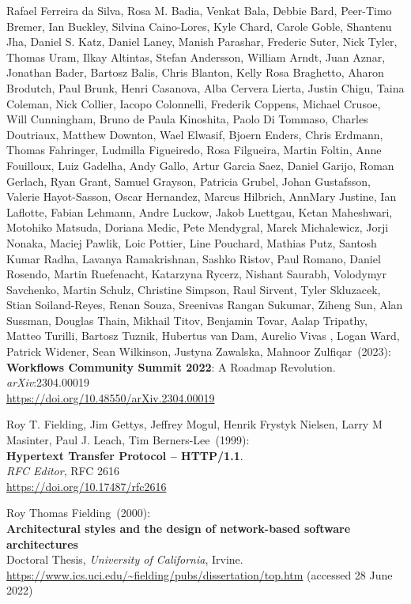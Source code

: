 \begin{thebibliography}{9}
Rafael Ferreira da Silva, Rosa M. Badia, Venkat Bala, Debbie Bard, Peer-Timo Bremer, Ian Buckley, Silvina Caino-Lores, Kyle Chard, Carole Goble, Shantenu Jha, Daniel S. Katz, Daniel Laney, Manish Parashar, Frederic Suter, Nick Tyler, Thomas Uram, Ilkay Altintas, Stefan Andersson, William Arndt, Juan Aznar, Jonathan Bader, Bartosz Balis, Chris Blanton, Kelly Rosa Braghetto, Aharon Brodutch, Paul Brunk, Henri Casanova, Alba Cervera Lierta, Justin Chigu, Taina Coleman, Nick Collier, Iacopo Colonnelli, Frederik Coppens, Michael Crusoe, Will Cunningham, Bruno de Paula Kinoshita, Paolo Di Tommaso, Charles Doutriaux, Matthew Downton, Wael Elwasif, Bjoern Enders, Chris Erdmann, Thomas Fahringer, Ludmilla Figueiredo, Rosa Filgueira, Martin Foltin, Anne Fouilloux, Luiz Gadelha, Andy Gallo, Artur Garcia Saez, Daniel Garijo, Roman Gerlach, Ryan Grant, Samuel Grayson, Patricia Grubel, Johan Gustafsson, Valerie Hayot-Sasson, Oscar Hernandez, Marcus Hilbrich, AnnMary Justine, Ian Laflotte, Fabian Lehmann, Andre Luckow, Jakob Luettgau, Ketan Maheshwari, Motohiko Matsuda, Doriana Medic, Pete Mendygral, Marek Michalewicz, Jorji Nonaka, Maciej Pawlik, Loic Pottier, Line Pouchard, Mathias Putz, Santosh Kumar Radha, Lavanya Ramakrishnan, Sashko Ristov, Paul Romano, Daniel Rosendo, Martin Ruefenacht, Katarzyna Rycerz, Nishant Saurabh, Volodymyr Savchenko, Martin Schulz, Christine Simpson, Raul Sirvent, Tyler Skluzacek, Stian Soiland-Reyes, Renan Souza, Sreenivas Rangan Sukumar, Ziheng Sun, Alan Sussman, Douglas Thain, Mikhail Titov, Benjamin Tovar, Aalap Tripathy, Matteo Turilli, Bartosz Tuznik, Hubertus van Dam, Aurelio Vivas , Logan Ward, Patrick Widener, Sean Wilkinson, Justyna Zawalska, Mahnoor Zulfiqar~(2023): \\
\textbf{Workflows Community Summit 2022}: A Roadmap Revolution.\\
\emph{arXiv}:2304.00019\\
\url{https://doi.org/10.48550/arXiv.2304.00019}

Roy T. Fielding, Jim Gettys, Jeffrey Mogul, Henrik Frystyk Nielsen, Larry M Masinter, Paul J. Leach, Tim Berners-Lee~(1999): \\
\textbf{Hypertext Transfer Protocol -- HTTP/1.1}.\\
\emph{RFC Editor}, RFC 2616\\
\url{https://doi.org/10.17487/rfc2616}


Roy Thomas Fielding~(2000): \\
\textbf{Architectural styles and the design of network-based software architectures}\\
Doctoral Thesis, 
\emph{University of California}, Irvine.\\
\url{https://www.ics.uci.edu/~fielding/pubs/dissertation/top.htm}
(accessed 28 June 2022) 



\end{thebibliography}
